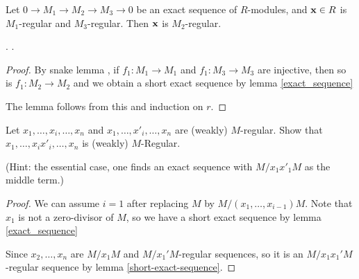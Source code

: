 	\begin{lemma}\label{short-exact-sequence}
		Let $0 \to M_1 \to M_2 \to M_3 \to 0$ be an exact sequence of $R$-modules, and $\mathbf{x} \in R$ is $M_1$-regular and $M_3$-regular. Then $\mathbf{x}$ is $M_2$-regular.
		
		\cite[Exercise 1.1.9]{BH}. \cite[\href{https://stacks.math.columbia.edu/tag/0F1T}{Lemma 0F1T}]{stacks-project}.
	\end{lemma}
	
	\begin{proof}
		By snake lemma \cite[\href{https://stacks.math.columbia.edu/tag/07JW}{Lemma 07JW}]{stacks-project}, if $f_1 : M_1 \to M_1$ and
		$f_1 : M_3 \to M_3$ are injective, then so is $f_1 : M_2 \to M_2$
		and we obtain a short exact sequence by lemma \ref{exact_sequence}
		\begin{center}
		\end{center}
		The lemma follows from this and induction on $r$.
	\end{proof}
	
	
	\begin{lemma}\label{isRegular_mul}
		Let $x_1, \dots, x_i, \dots, x_n$ and $x_1, \dots, x'_i, \dots, x_n$ are (weakly) $M$-regular. Show that $x_1, \dots, x_ix'_i, \dots, x_n$ is (weakly) $M$-Regular.
		
		\cite[Exercise 1.1.10(a)]{BH}
	\end{lemma}
	(Hint: the essential case, one finds an exact sequence with $M/x_1x'_1M$ as the middle term.)
	
	\begin{proof}
		We can assume $ i = 1 $ after replacing $ M $ by $ M / (x_1, \dots, x_{i -1})M $. Note that $ x_1 $ is not a zero-divisor of $ M $, so we have a short exact sequence by lemma \ref{exact_sequence}
		\begin{center}
		\end{center}
		Since $ x_2, \dots, x_n $ are $ M/x_1M $ and $ M/x_1'M $-regular sequences, so it is an $ M / x_1x_1'M $ -regular sequence by lemma \ref{short-exact-sequence}.
	\end{proof}
	
